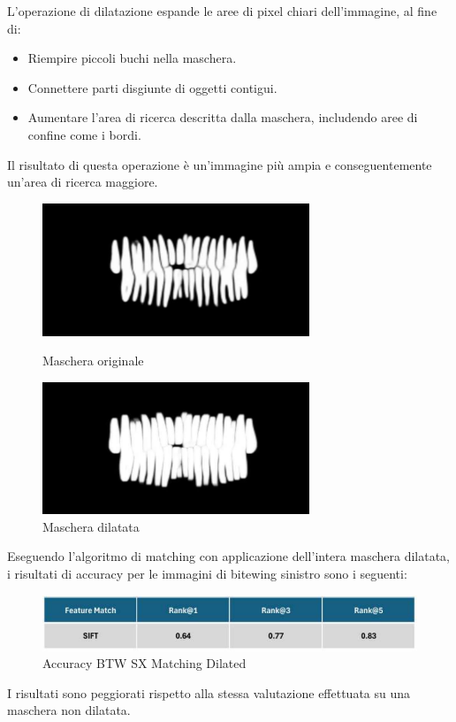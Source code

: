 \documentclass[12pt,a4paper,openright,twoside]{book}
\begin{document}
L'operazione di dilatazione espande le aree di pixel chiari dell'immagine, al fine di:
\begin{itemize}
\item Riempire piccoli buchi nella maschera.
\item Connettere parti disgiunte di oggetti contigui.
\item Aumentare l'area di ricerca descritta dalla maschera, includendo aree di confine come i bordi.
\end{itemize}

Il risultato di questa operazione è un'immagine più ampia e conseguentemente un'area di ricerca maggiore.
\begin{figure}[H]
    \centering
    \begin{minipage}{0.45\textwidth}
	\centering
    	\includegraphics[width=8cm]{figures/maskoriginal.pdf}
    	\caption{Maschera originale}
    	\label{lab:Maschera Originale}
    \end{minipage}\hfill
    \begin{minipage}{0.45\textwidth}
    	\centering
    	\includegraphics[width=8cm]{figures/maskdilated.pdf}
    	\caption{Maschera dilatata}
    	\label{lab:Maschera dilatata}
    \end{minipage}\hfill
\end{figure}

Eseguendo l'algoritmo di matching con applicazione dell'intera maschera dilatata, i risultati di accuracy per le immagini di bitewing sinistro sono i seguenti:
\begin{figure}[H]
	\centering
	\includegraphics{figures/sx6.pdf}
    	\caption{Accuracy BTW SX Matching Dilated}
	\label{fig:sx6}
\end{figure}
I risultati sono peggiorati rispetto alla stessa valutazione effettuata su una maschera non dilatata.\\
\end{document}
